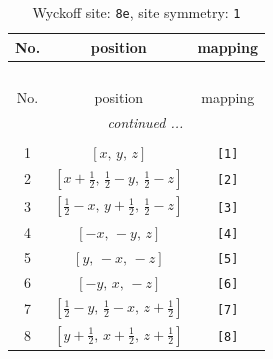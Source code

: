 \documentclass[fleqn,8pt]{jsarticle}
\begin{document}
\renewcommand{\arraystretch}{1.2}
\begin{longtable}{ccc}
\caption{Wyckoff site: {\tt 8e}, site symmetry: {\tt 1}}
 \\
 \hline \hline
No. & position & mapping \\ \hline \endfirsthead

\multicolumn{2}{l}{\tablename\ \thetable{}} \\
 \hline \hline
No. & position & mapping \\ \hline \endhead

 \hline \hline
\multicolumn{2}{r}{\footnotesize\it continued ...} \\ \endfoot

 \hline \hline
\multicolumn{2}{r}{} \\ \endlastfoot

1 & $\left[ x,\, y,\, z \right]$ & {\tt [1]} \\ \hline
2 & $\left[ x + \frac{1}{2},\, \frac{1}{2} - y,\, \frac{1}{2} - z \right]$ & {\tt [2]} \\ \hline
3 & $\left[ \frac{1}{2} - x,\, y + \frac{1}{2},\, \frac{1}{2} - z \right]$ & {\tt [3]} \\ \hline
4 & $\left[ - x,\, - y,\, z \right]$ & {\tt [4]} \\ \hline
5 & $\left[ y,\, - x,\, - z \right]$ & {\tt [5]} \\ \hline
6 & $\left[ - y,\, x,\, - z \right]$ & {\tt [6]} \\ \hline
7 & $\left[ \frac{1}{2} - y,\, \frac{1}{2} - x,\, z + \frac{1}{2} \right]$ & {\tt [7]} \\ \hline
8 & $\left[ y + \frac{1}{2},\, x + \frac{1}{2},\, z + \frac{1}{2} \right]$ & {\tt [8]} \\
\end{longtable}
\end{document}
